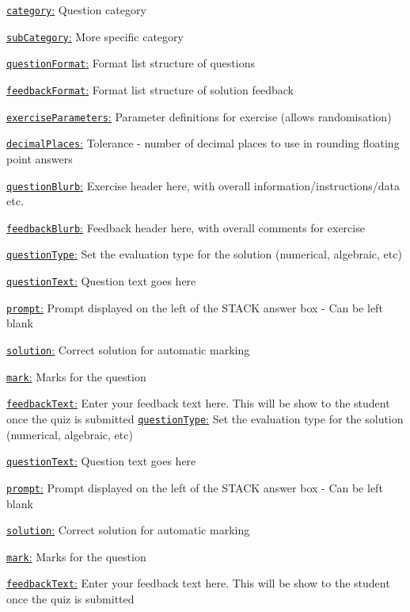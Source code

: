 \documentclass[preview]{standalone}
\newcommand \fieldname[1]{\underline{\texttt{#1}:}}
\begin{document}
\fieldname{category}  %
Question category

\fieldname{subCategory} %
More specific category

\fieldname{questionFormat}
Format list structure of questions

\fieldname{feedbackFormat}
Format list structure of solution feedback

\fieldname{exerciseParameters}
Parameter definitions for exercise (allows randomisation)

\fieldname{decimalPlaces}
Tolerance - number of decimal places to use in rounding floating point answers

\fieldname{questionBlurb}
Exercise header here, with overall information/instructions/data etc.

\fieldname{feedbackBlurb}
Feedback header here, with overall comments for exercise

\fieldname{questionType}
Set the evaluation type for the solution (numerical, algebraic, etc)

\fieldname{questionText}
Question text goes here

\fieldname{prompt}
Prompt displayed on the left of the STACK answer box - Can be left blank

\fieldname{solution}
Correct solution for automatic marking

\fieldname{mark}
Marks for the question

\fieldname{feedbackText}
Enter your feedback text here. This will be show to the student once the quiz is submitted
\fieldname{questionType}
Set the evaluation type for the solution (numerical, algebraic, etc)

\fieldname{questionText}
Question text goes here

\fieldname{prompt}
Prompt displayed on the left of the STACK answer box - Can be left blank

\fieldname{solution}
Correct solution for automatic marking

\fieldname{mark}
Marks for the question

\fieldname{feedbackText}
Enter your feedback text here. This will be show to the student once the quiz is submitted
\end{document}
